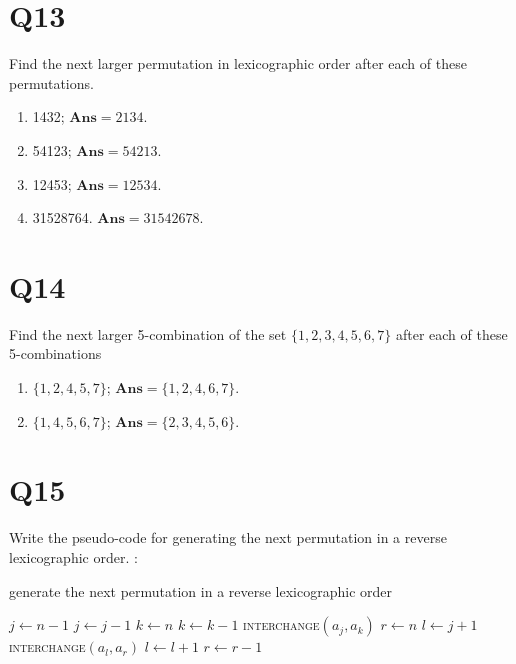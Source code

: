 \documentclass[a4paper,11pt]{article}
\newenvironment{qparts}{\begin{enumerate}[{(}a{)}]}{\end{enumerate}}
\newenvironment{solution}{{\\\bf Solution}:}{\smallskip}
\begin{document}
\section*{Q13}
Find the next larger permutation in lexicographic order after each of these permutations.
\begin{qparts}
    
    \item  1432; $\textbf{Ans}=2134$.

    \item  54123; $\textbf{Ans}=54213$.

    \item  12453; $\textbf{Ans}=12534$.

    \item  31528764. $\textbf{Ans}=31542678$.
\end{qparts}

\section*{Q14}
Find the next larger 5-combination of the set $\{ 1,2,3,4,5,6,7 \}$ after each of these 5-combinations
\begin{qparts}
    
    \item  $\{ 1,2,4,5,7 \}$; $\textbf{Ans}=\{ 1,2, 4,6,7\}$.

    \item  $\{ 1,4,5,6,7 \}$; $\textbf{Ans}=\{ 2,3,4,5,6 \}$.

\end{qparts}

\section*{Q15}
Write the pseudo-code for generating the next permutation in a reverse lexicographic order.
\begin{solution}
\begin{algorithm}
    \caption{generate the next permutation in a reverse lexicographic order}
    \begin{algorithmic}
        \State $j \gets n-1$
            \State $j\gets j-1$
        \EndWhile
        \State $k\gets n$
            \State $k\gets k-1$
        \EndWhile
        \State \textsc{interchange}$(a_{j},a_{k})$
        \State $r\gets n$
        \State $l \gets j+1$
            \State \textsc{interchange}$(a_{l},a_{r})$
            \State $l\gets l+1$
            \State $r\gets r-1$
        \EndWhile
    \EndProcedure
    \end{algorithmic}
\end{algorithm}
\end{solution}
\end{document}
